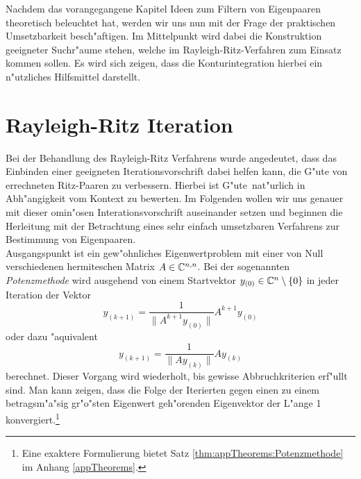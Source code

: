 Nachdem das vorangegangene Kapitel Ideen zum Filtern von Eigenpaaren theoretisch beleuchtet hat, werden wir uns nun mit der Frage der praktischen Umsetzbarkeit besch"aftigen.
Im Mittelpunkt wird dabei die Konstruktion geeigneter Suchr"aume stehen, welche im Rayleigh-Ritz-Verfahren zum Einsatz kommen sollen.
Es wird sich zeigen, dass die Konturintegration hierbei ein n"utzliches Hilfsmittel darstellt.

\section{Rayleigh-Ritz Iteration}\label{chap4:beschrr}



Bei der Behandlung des Rayleigh-Ritz Verfahrens wurde angedeutet, dass das Einbinden einer geeigneten Iterationsvorschrift dabei helfen kann, die G"ute von errechneten Ritz-Paaren zu verbessern.
Hierbei ist \glqq G"ute\grqq\ nat"urlich in Abh"angigkeit vom Kontext zu bewerten. Im Folgenden wollen wir uns genauer mit dieser omin"osen Interationsvorschrift auseinander setzen und beginnen die Herleitung mit der Betrachtung eines sehr einfach umsetzbaren Verfahrens zur Bestimmung von Eigenpaaren.\\


Ausgangspunkt ist ein gew"ohnliches Eigenwertproblem mit einer von Null verschiedenen hermiteschen Matrix $A\in\mathbb{C}^{n,n}$. Bei der sogenannten \emph{Potenzmethode} wird
ausgehend von einem Startvektor $y_{(0)}\in\mathbb{C}^n \setminus\{0\}$ in jeder Iteration der Vektor
\[
y_{(k+1)} = \frac{1}{\|A^{k+1} y_{(0)}\|} A^{k+1}y_{(0)}
\]
oder dazu "aquivalent
\[
y_{(k+1)} = \frac{1}{\|Ay_{(k)}\|} Ay_{(k)}
\]
berechnet. Dieser Vorgang wird wiederholt, bis gewisse Abbruchkriterien erf"ullt sind. Man kann zeigen, dass die Folge der Iterierten gegen einen zu einem betragsm"a"sig gr"o"sten Eigenwert geh"orenden Eigenvektor der L"ange 1 konvergiert.\footnote{Eine exaktere Formulierung bietet Satz \ref{thm:appTheorems:Potenzmethode} im Anhang \ref{appTheorems}.}

